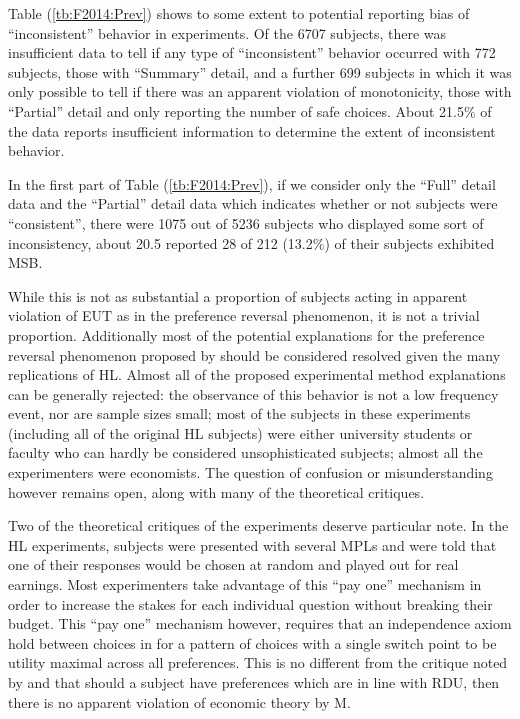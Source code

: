 \documentclass[../main.tex]{subfiles}
\begin{document}
Table (\ref{tb:F2014:Prev}) shows to some extent to potential reporting bias of \enquote{inconsistent} behavior in experiments.
Of the 6707 subjects, there was insufficient data to tell if any type of \enquote{inconsistent} behavior occurred with 772 subjects, those with \enquote{Summary} detail, and a further 699 subjects in which it was only possible to tell if there was an apparent violation of monotonicity, those with \enquote{Partial} detail and only reporting the number of safe choices.
About 21.5\% of the data reports insufficient information to determine the extent of inconsistent behavior.

In the first part of Table (\ref{tb:F2014:Prev}), if we consider only the \enquote{Full} detail data and the \enquote{Partial} detail data which indicates whether or not subjects were \enquote{consistent}, there were 1075 out of 5236 subjects who displayed some sort of inconsistency, about 20.5%
\textcite[1647]{Holt2002} reported 28 of 212 (13.2\%) of their subjects exhibited MSB.

While this is not as substantial a proportion of subjects acting in apparent violation of EUT as in the \textcite{Grether1979} preference reversal phenomenon, it is not a trivial proportion.
Additionally most of the potential explanations for the preference reversal phenomenon proposed by \textcite{Grether1979} should be considered resolved given the many replications of HL.
Almost all of the proposed experimental method explanations can be generally rejected: the observance of this behavior is not a low frequency event, nor are sample sizes small; most of the subjects in these experiments (including all of the original HL subjects) were either university students or faculty who can hardly be considered unsophisticated subjects; almost all the experimenters were economists.
The question of confusion or misunderstanding however remains open, along with many of the theoretical critiques.

Two of the theoretical critiques of the \textcite{Grether1979} experiments deserve particular note.
In the HL experiments, subjects were presented with several MPLs and were told that one of their responses would be chosen at random and played out for real earnings.
Most experimenters take advantage of this \enquote{pay one} mechanism in order to increase the stakes for each individual question without breaking their budget.
This \enquote{pay one} mechanism however, requires that an independence axiom hold between choices in for a pattern of choices with a single switch point to be utility maximal across all preferences.
This is no different from the critique noted by \textcite{Holt1986} and \textcite{Karni1987} that should a subject have preferences which are in line with RDU, then there is no apparent violation of economic theory by M.
\end{document}
